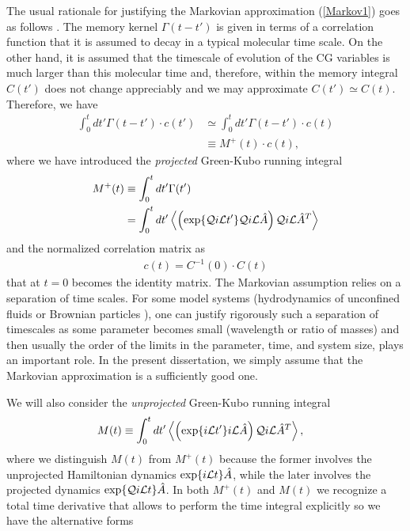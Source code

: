 \documentclass[b5paper,openright,10pt]{book}
\newcommand{\esc}{\!\cdot\!}
\newcommand{\llangle}{\left\langle}
\newcommand{\rrangle}{\right\rangle}
\begin{document}
The  usual  rationale  for   justifying  the  Markovian  approximation
(\ref{Markov1})  goes  as  follows  \cite{Grabert1982,Kubo1991}.   The
memory  kernel  $\Gamma(t-t')$ is  given  in  terms of  a  correlation
function  that it  is assumed  to decay  in a  typical molecular  time
scale.   On the  other hand,  it  is assumed  that the  timescale  of
evolution of the CG variables is  much larger than this molecular time
and, therefore,  within the  memory integral  $C(t')$ does  not change
appreciably and we may  approximate $C(t')\simeq C(t)$.  Therefore, we
have
\begin{align}
  \int_0^tdt' \Gamma(t-t')\esc c(t')&\simeq  \int_0^tdt' \Gamma(t-t')\esc  c(t)
\nonumber\\
&\equiv
M^+(t)\esc c(t),
\label{M+c}
\end{align}
where we have introduced the \textit{projected} Green-Kubo running integral
\begin{align}
M^+(t)&\equiv  \int_0^tdt' \Gamma(t') 
\nonumber\\
& =\int_0^tdt' \llangle \left(\exp\{{\cal Q}i{\cal   L}t'\}{\cal Q}i{\cal L}\hat{A} \right){\cal Q} i{\cal L}\hat{A}^T\rrangle 
\label{Mt}
\end{align}
and the normalized correlation matrix as
\begin{align}
  c(t)=C^{-1}(0)\esc C(t)
\label{cnorm}
\end{align}
that  at $t=0$  becomes  the identity  matrix.   The  Markovian
  assumption relies  on a  separation of time  scales. For  some model
  systems  (hydrodynamics of  unconfined  fluids \cite{Selwyn1971}  or
  Brownian  particles \cite{Mazur1970}),  one  can justify  rigorously
  such a  separation of  timescales as  some parameter  becomes small
  (wavelength or  ratio of masses) and  then usually the order  of the
  limits in the  parameter, time, and system size,  plays an important
  role.  In the  present dissertation,  we simply  assume that  the Markovian
  approximation is a sufficiently good one.


We will also consider
the \textit{unprojected} Green-Kubo running integral
\begin{align}
M(t)&\equiv  \int_0^{t} dt' \llangle \left(\exp\{i{\cal   L}t'\}i{\cal L}\hat{A} \right){\cal Q} i{\cal L}\hat{A}^T\rrangle,
\label{Mtau}
\end{align}
where we distinguish $M(t)$ from  $M^+(t)$ because the former involves
the  unprojected  Hamiltonian  dynamics  $\exp\{i{\cal  L}t\}\hat{A}$,
while the later involves  the projected dynamics $\exp\{{\cal Q}i{\cal
  L}t\}\hat{A}$.  In  both $M^+(t)$  and $M(t)$  we recognize  a total
time derivative that allows to perform the time integral explicitly so
we have the alternative forms
\end{document}
